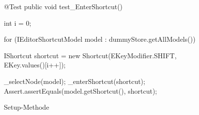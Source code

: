 \begin{wrapfigure}[11]{l}[0px]{322px}
    \centering
	\vspace{-12px}
	\begin{spacing}{0.75}
		\begin{javacode}[firstnumber=28]
@Test
public void test_EnterShortcut()
{
  int i = 0;
  
  for (IEditorShortcutModel model : dummyStore.getAllModels())
  {
    IShortcut shortcut = new Shortcut(EKeyModifier.SHIFT,
                                      EKey.values()[i++]);
    
    _selectNode(model);
    _enterShortcut(shortcut);
    Assert.assertEquals(model.getShortcut(), shortcut);
  }
}\end{javacode}
	\end{spacing}
	\caption{Setup-Methode}
	\label{fig:Test-ShortcutEditor-EnterShortcut}
\end{wrapfigure}